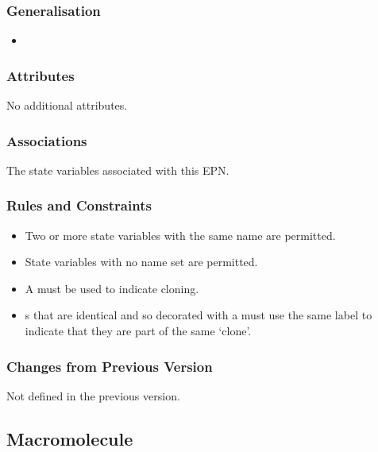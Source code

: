 \subsubsection{Generalisation}

\begin{itemize}
\item {}
\end{itemize}

\subsubsection{Attributes}

No additional attributes.

\subsubsection{Associations}

\begin{itemize}
 The state variables
  associated with this EPN.
\end{itemize}

\subsubsection{Rules and Constraints}

\begin{itemize}
\item Two or more state variables with the same name are
  permitted.
\item State variables with no name set are permitted.
\item A  must be used to indicate
  cloning.
\item {}s that are identical and so decorated
  with a  must use the same 
  label to indicate that they are part of the same `clone'.
\end{itemize}

\subsubsection{Changes from Previous Version}

Not defined in the previous version.

\subsection{Macromolecule}
\label{sec:macromolecule}

